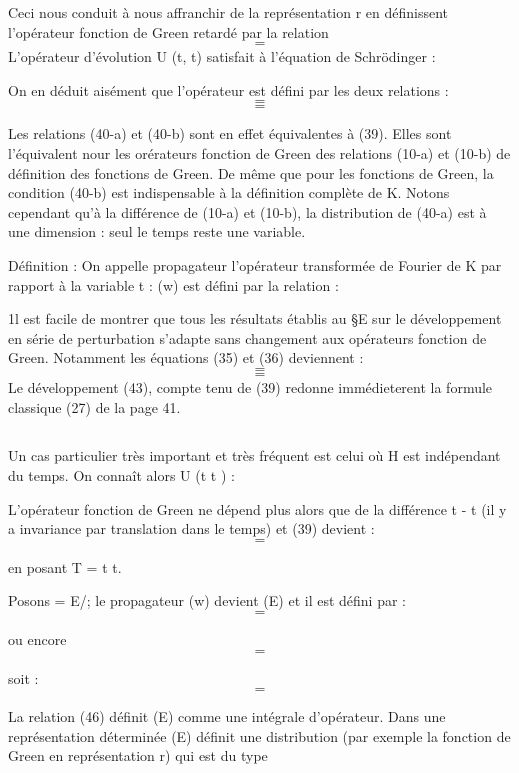 
Ceci nous conduit à nous affranchir de la représentation r en définissent
l'opérateur fonction de Green retardé par la relation
\[
\tag{39}=
\]
L'opérateur d'évolution U (t, t) satisfait à l'équation de Schrödinger :

On en déduit aisément que l'opérateur  est défini par les
deux relations :
\[
\tag{40-a}=
\]
\[
\tag{40-b}=
\]

Les relations (40-a) et (40-b) sont en effet équivalentes à (39). Elles
sont l'équivalent nour les orérateurs fonction de Green des relations
(10-a) et (10-b) de définition des fonctions de Green. De même que pour
les fonctions de Green, la condition (40-b) est indispensable à la définition
complète de K. Notons cependant qu'à la différence de (10-a) et
(10-b), la distribution  de (40-a) est à une dimension : seul le temps
reste une variable.

Définition : On appelle propagateur  l'opérateur transformée de
Fourier de K par rapport à la variable t : (w) est défini par la
relation :

1l est facile de montrer que tous les résultats établis au \S E sur le
développement en série de perturbation s'adapte sans changement aux opérateurs
fonction de Green. Notamment les équations (35) et (36) deviennent :
\[
\tag{42}=
\]
\[
\tag{43}=
\]
Le développement (43), compte tenu de (39) redonne immédieterent la formule
classique (27) de la page 41.

 

\subsection{}%

Un cas particulier très important et très fréquent est celui où
H est indépendant du temps.
On connaît alors U (t t ) :

L'opérateur fonction de Green ne dépend plus alors que de la différence
t - t (il y a invariance par translation dans le temps) et (39) devient :
\[
\tag{44}=
\]

en posant T = t t.

Posons  = E/; le propagateur (w) devient (E) et il est défini
par :
\[
\tag{45}=
\]


ou encore
\[
=
\]

soit :
\[
\tag{46}=
\]

La relation (46) définit (E) comme une intégrale d'opérateur. Dans
une représentation déterminée (E) définit une distribution (par
exemple la fonction de Green en représentation r) qui est du type

